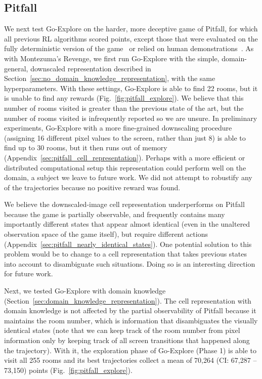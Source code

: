 \documentclass{article}
\newcommand{\pivotci}[2]{(CI: #1 -- #2)}  \newcommand{\percci}[2]{}  \newcommand{\tpivotci}[2]{(#1 -- #2)}  \newcommand{\tpercci}[2]{}  \newcommand{\na}[0]{-}
\begin{document}
\FloatBarrier

\subsection{Pitfall}
\label{sec:pitfall_results}

We next test Go-Explore on the harder, more deceptive game of Pitfall, for which all previous RL algorithms scored  points, except those that were evaluated on the fully deterministic version of the game~\cite{liu2019learning, Keramati2018FastEW} or relied on human demonstrations~\cite{hester2017deep, pohlen2018observe, aytar2018playing}. 
As with Montezuma's Revenge, we first run Go-Explore with the simple, domain-general, downscaled representation described in Section~\ref{sec:no_domain_knowledge_representation}, with the same hyperparameters. With these settings, Go-Explore is able to find 22 rooms, but it is unable to find any rewards (Fig.~\ref{fig:pitfall_explore}). We believe that this number of rooms visited is greater than the previous state of the art, but the number of rooms visited is infrequently reported so we are unsure.
In preliminary experiments, Go-Explore with a more fine-grained downscaling procedure (assigning 16 different pixel values to the screen, rather than just 8) is able to find up to 30 rooms, but it then runs out of memory (Appendix~\ref{sec:pitfall_cell_representation}). Perhaps with a more efficient or distributed computational setup this representation could perform well on the domain, a subject we leave to future work.
We did not attempt to robustify any of the trajectories because no positive reward was found.

We believe the downscaled-image cell representation underperforms on Pitfall because the game is partially observable, and frequently contains many importantly different states that appear almost identical (even in the unaltered observation space of the game itself), but require different actions (Appendix~\ref{sec:pitfall_nearly_identical_states}).
One potential solution to this problem would be to change to a cell representation that takes previous states into account to disambiguate such situations. Doing so is an interesting direction for future work.

Next, we tested Go-Explore with domain knowledge (Section~\ref{sec:domain_knowledge_representation}). The cell representation with domain knowledge is not affected by the partial observability of Pitfall because it maintains the room number, which is information that disambiguates the visually identical states (note that we can keep track of the room number from pixel information only by keeping track of all screen transitions that happened along the trajectory). With it, the exploration phase of Go-Explore (Phase 1) is able to visit all 255 rooms and its best trajectories collect a mean of 70,264 \percci{67,390}{73,180}\pivotci{67,287}{73,150} points (Fig.~\ref{fig:pitfall_explore}).
\end{document}
